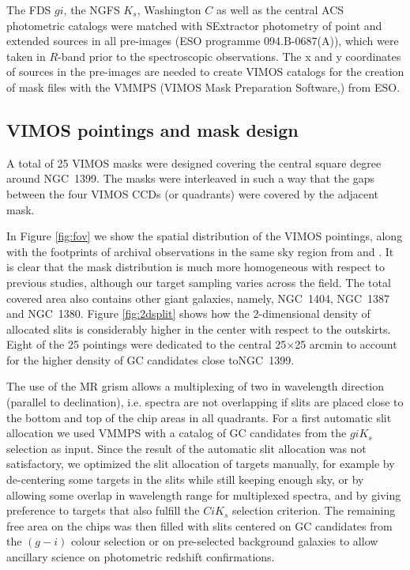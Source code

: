 \documentclass[useAMS,usenatbib]{mn2e}
\begin{document}
The FDS $gi$, the NGFS $K_s$, Washington $C$ as well as the central ACS  photometric catalogs were matched with SExtractor photometry of point and extended sources in all pre-images (ESO programme 094.B-0687(A)), which were taken in $R$-band prior to the spectroscopic observations. The x and y coordinates of sources in the pre-images are needed to create VIMOS catalogs for the creation of mask files with the VMMPS (VIMOS Mask Preparation Software,\citealt{Bottini05}) from ESO.

\subsection{VIMOS pointings and mask design}
\label{sec:VIMOSpointings}

A total of 25 VIMOS masks were designed covering the central square degree around NGC~1399. The masks were interleaved in such a way that the gaps between the four VIMOS CCDs (or quadrants) were covered by the adjacent mask. 

In Figure \ref{fig:fov} we show the spatial distribution of the VIMOS pointings, along with the footprints of archival observations in the same sky region from \citet{Schuberth} and \citet{Bergond07}. It is clear that the mask distribution is much more homogeneous with respect to previous studies, although our target sampling varies across the field. The total covered area also contains other giant galaxies, namely, NGC~1404, NGC~1387 and NGC~1380.  
Figure \ref{fig:2dsplit} shows how the 2-dimensional density of allocated slits is considerably higher in the center with respect to the outskirts. Eight of the 25 pointings were dedicated to the central 25$\times$25 arcmin to account for the higher density of GC candidates close toNGC~1399. 

The use of the MR grism allows a multiplexing of two in wavelength direction (parallel to declination), i.e. spectra are not overlapping if slits are placed close to the bottom and top of the chip areas in all quadrants. 
For a first automatic slit allocation we used VMMPS with a catalog of GC candidates from the $giK_s$ selection as input. Since the result of the automatic slit allocation was not satisfactory, we optimized the slit allocation of targets manually, for example by de-centering some targets in the slits while still keeping enough sky, or by allowing some overlap in wavelength range for multiplexed spectra, and by giving preference to targets that also fulfill the $CiK_s$ selection criterion. The remaining free area on the chips was then filled with slits centered on GC candidates from the $(g-i)$ colour selection or on pre-selected background galaxies to allow ancillary science on photometric redshift confirmations.
\end{document}
